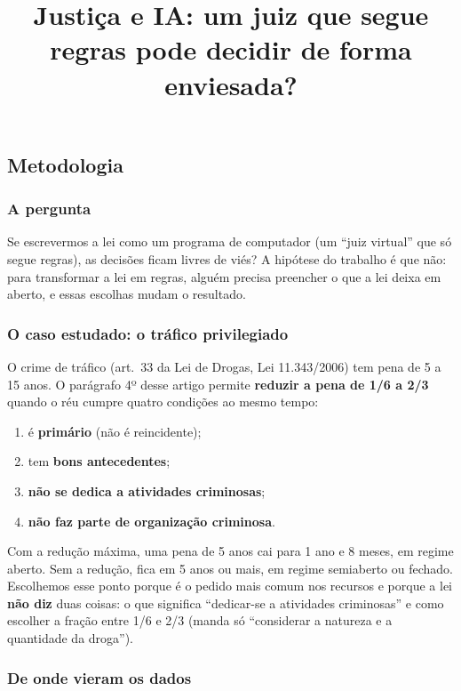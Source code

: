 \documentclass[11pt,a4paper]{article}
\title{Justiça e IA: um juiz que segue regras pode decidir de forma enviesada?}
\author{}
\date{}
\begin{document}
\maketitle

\subsection{Metodologia}

\subsubsection*{A pergunta}

Se escrevermos a lei como um programa de computador (um ``juiz virtual'' que só segue
regras), as decisões ficam livres de viés? A hipótese do trabalho é que não: para
transformar a lei em regras, alguém precisa preencher o que a lei deixa em aberto, e
essas escolhas mudam o resultado.

\subsubsection*{O caso estudado: o tráfico privilegiado}

O crime de tráfico (art.~33 da Lei de Drogas, Lei 11.343/2006) tem pena de 5 a 15 anos.
O parágrafo 4º desse artigo permite \textbf{reduzir a pena de 1/6 a 2/3} quando o réu
cumpre quatro condições ao mesmo tempo:
\begin{enumerate}
  \item é \textbf{primário} (não é reincidente);
  \item tem \textbf{bons antecedentes};
  \item \textbf{não se dedica a atividades criminosas};
  \item \textbf{não faz parte de organização criminosa}.
\end{enumerate}
Com a redução máxima, uma pena de 5 anos cai para 1 ano e 8 meses, em regime aberto.
Sem a redução, fica em 5 anos ou mais, em regime semiaberto ou fechado.
Escolhemos esse ponto porque é o pedido mais comum nos recursos e porque a lei
\textbf{não diz} duas coisas: o que significa ``dedicar-se a atividades criminosas'' e
como escolher a fração entre 1/6 e 2/3 (manda só ``considerar a natureza e a quantidade
da droga'').

\subsubsection*{De onde vieram os dados}
\end{document}

